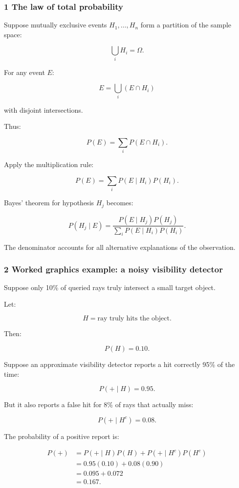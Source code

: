 \subsubsection{1 The law of total probability}\label{02-foundations-ii-ch023-the-law-of-total-probability}

Suppose mutually exclusive events \(H_1,\ldots,H_n\) form a partition of the sample space:

\[
 \bigcup_iH_i=\Omega.
\]

For any event \(E\):

\[
 E=\bigcup_i(E\cap H_i)
\]

with disjoint intersections.

Thus:

\[
 P(E)=\sum_iP(E\cap H_i).
\]

Apply the multiplication rule:

\[
 \boxed{ P(E)=\sum_iP(E\mid H_i)P(H_i) }.
\]

Bayes' theorem for hypothesis \(H_j\) becomes:

\[
 \boxed{ P(H_j\mid E) = \frac{ P(E\mid H_j)P(H_j) }{ \sum_iP(E\mid H_i)P(H_i) } }.
\]

The denominator accounts for all alternative explanations of the observation.

\subsubsection{2 Worked graphics example: a noisy visibility detector}\label{02-foundations-ii-ch023-worked-graphics-example-a-noisy-visibility-detector}

Suppose only 10\% of queried rays truly intersect a small target object.

Let:

\[
 H=\text{ray truly hits the object}.
\]

Then:

\[
 P(H)=0.10.
\]

Suppose an approximate visibility detector reports a hit correctly 95\% of the time:

\[
 P(+\mid H)=0.95.
\]

But it also reports a false hit for 8\% of rays that actually miss:

\[
 P(+\mid H^c)=0.08.
\]

The probability of a positive report is:

\[
 \begin{aligned} P(+) &=P(+\mid H)P(H) +P(+\mid H^c)P(H^c)\\ &=0.95(0.10)+0.08(0.90)\\ &=0.095+0.072\\ &=\boxed{0.167}. \end{aligned}
\]


